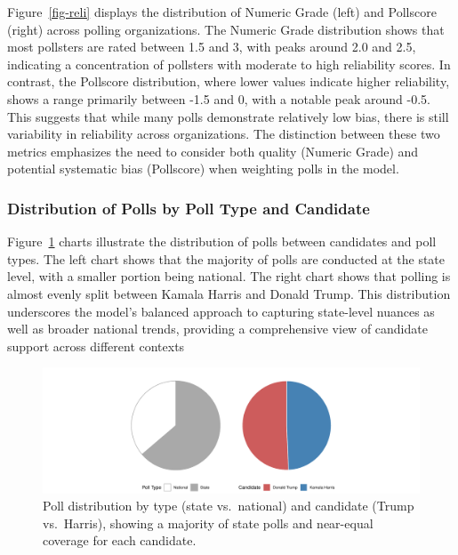 \documentclass[
  letterpaper,
  DIV=11,
  numbers=noendperiod]{scrartcl}
\begin{document}
Figure~\ref{fig-reli} displays the distribution of Numeric Grade (left)
and Pollscore (right) across polling organizations. The Numeric Grade
distribution shows that most pollsters are rated between 1.5 and 3, with
peaks around 2.0 and 2.5, indicating a concentration of pollsters with
moderate to high reliability scores. In contrast, the Pollscore
distribution, where lower values indicate higher reliability, shows a
range primarily between -1.5 and 0, with a notable peak around -0.5.
This suggests that while many polls demonstrate relatively low bias,
there is still variability in reliability across organizations. The
distinction between these two metrics emphasizes the need to consider
both quality (Numeric Grade) and potential systematic bias (Pollscore)
when weighting polls in the model.

\vspace{0.7cm}

\hypertarget{distribution-of-polls-by-poll-type-and-candidate}{%
\subsubsection{Distribution of Polls by Poll Type and
Candidate}\label{distribution-of-polls-by-poll-type-and-candidate}}

Figure~\ref{fig-pie} charts illustrate the distribution of polls between
candidates and poll types. The left chart shows that the majority of
polls are conducted at the state level, with a smaller portion being
national. The right chart shows that polling is almost evenly split
between Kamala Harris and Donald Trump. This distribution underscores
the model's balanced approach to capturing state-level nuances as well
as broader national trends, providing a comprehensive view of candidate
support across different contexts

\begin{figure}

{\centering \includegraphics{paper_files/figure-pdf/fig-pie-1.pdf}

}

\caption{\label{fig-pie}Poll distribution by type (state vs.~national)
and candidate (Trump vs.~Harris), showing a majority of state polls and
near-equal coverage for each candidate.}

\end{figure}
\end{document}
